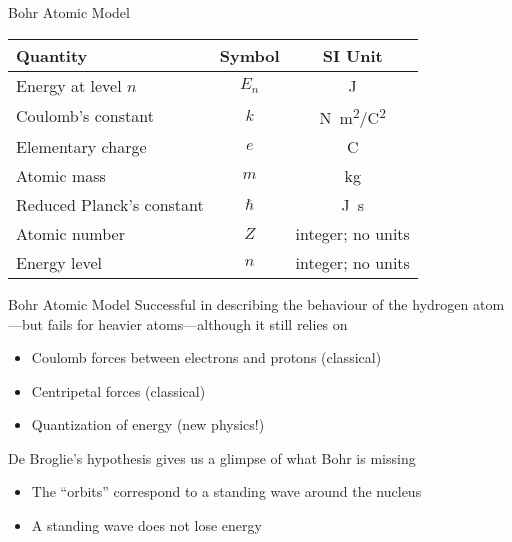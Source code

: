 \documentclass[12pt,compress,aspectratio=169]{beamer}
\newcommand{\eq}[2]{\vspace{#1}{\Large\begin{displaymath}#2\end{displaymath}}}
\begin{document}
\begin{frame}{Bohr Atomic Model}
  \eq{-.1in}{
    \boxed{E_n=-\frac{k^2e^4m}{2\hbar^2}\frac{Z^2}{n^2}}
  }
  \begin{center}
    \begin{tabular}{l|c|c}
      \rowcolor{pink}
      \textbf{Quantity} & \textbf{Symbol} & \textbf{SI Unit} \\ \hline
      Energy at level $n$ & $E_n$ & \si{\joule} \\
      Coulomb's constant & $k$ & \si{N.m^2/C^2} \\
      Elementary charge  & $e$ & \si{\coulomb} \\
      Atomic mass        & $m$ & \si{\kilo\gram} \\
      Reduced Planck's constant & $\hbar$ & \si{\joule.\second}\\
      Atomic number      & $Z$ & integer; no units\\
      Energy level       & $n$ & integer; no units
    \end{tabular}
  \end{center}
\end{frame}


\begin{frame}{Bohr Atomic  Model}
  Successful in describing the behaviour of the hydrogen atom---but fails for
  heavier atoms---although it still relies on 
  \begin{itemize}
  \item Coulomb forces between electrons and protons (classical)
  \item Centripetal forces (classical)
  \item Quantization of energy (new physics!)
  \end{itemize}
  De Broglie's hypothesis gives us a glimpse of what Bohr is missing
  \begin{itemize}
  \item The ``orbits'' correspond to a standing wave around the nucleus
  \item A standing wave does not lose energy
  \end{itemize}
\end{frame}
\end{document}
